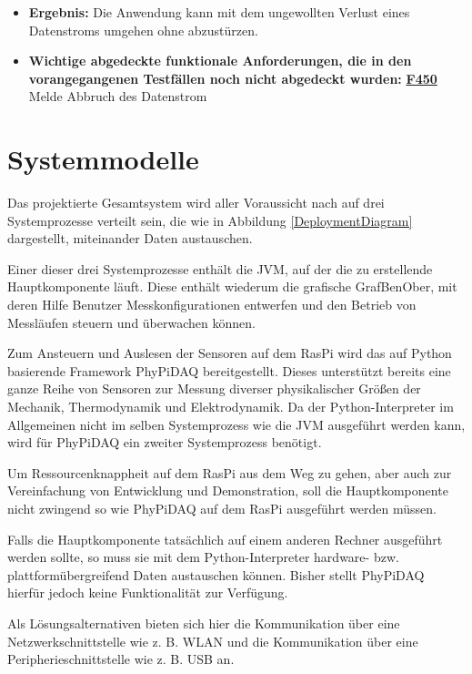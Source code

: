 \documentclass[parskip=full]{scrartcl}
\begin{document}
\begin{description}
\begin{itemize}
\item []\textbf{Ergebnis:} Die Anwendung kann mit dem ungewollten Verlust eines Datenstroms umgehen ohne abzustürzen.
\item []\textbf{Wichtige abgedeckte funktionale Anforderungen, die in den vorangegangenen Testfällen noch nicht abgedeckt wurden:} \hyperlink{link-f450}{\textbf{F450}} Melde Abbruch des Datenstrom

\end{itemize}


\end{description}

\clearpage

\section{Systemmodelle}\label{systemmodell}

Das projektierte Gesamtsystem wird aller Voraussicht nach auf drei Systemprozesse verteilt sein, die wie in Abbildung \ref{DeploymentDiagram} dargestellt, miteinander Daten austauschen.

Einer dieser drei Systemprozesse enthält die \gls{JVM}, auf der die zu erstellende Hauptkomponente läuft. Diese enthält wiederum die grafische \gls{GrafBenOber}, mit deren Hilfe Benutzer Messkonfigurationen entwerfen und den Betrieb von Messläufen steuern und überwachen können.

Zum Ansteuern und Auslesen der Sensoren auf dem \gls{RasPi} wird das auf Python basierende Framework \gls{PhyPiDAQ} bereitgestellt. Dieses unterstützt bereits eine  ganze Reihe von Sensoren zur Messung diverser physikalischer Größen der Mechanik, Thermodynamik und Elektrodynamik. Da der Python-Interpreter im Allgemeinen nicht im selben Systemprozess wie die \gls{JVM} ausgeführt werden kann, wird für PhyPiDAQ ein zweiter Systemprozess benötigt.

Um Ressourcenknappheit auf dem \gls{RasPi} aus dem Weg zu gehen, aber auch zur Vereinfachung von Entwicklung und Demonstration, soll die Hauptkomponente nicht zwingend so wie PhyPiDAQ auf dem \gls{RasPi} ausgeführt werden müssen. 

Falls die Hauptkomponente tatsächlich auf einem anderen Rechner ausgeführt werden sollte, so muss sie mit dem Python-Interpreter hardware- bzw. plattformübergreifend Daten austauschen können. Bisher stellt PhyPiDAQ hierfür jedoch keine Funktionalität zur Verfügung. 

Als Lösungsalternativen bieten sich hier die Kommunikation über eine Netzwerkschnittstelle wie z. B. WLAN und die Kommunikation über eine Peripherieschnittstelle wie z. B. USB an.
\end{document}
